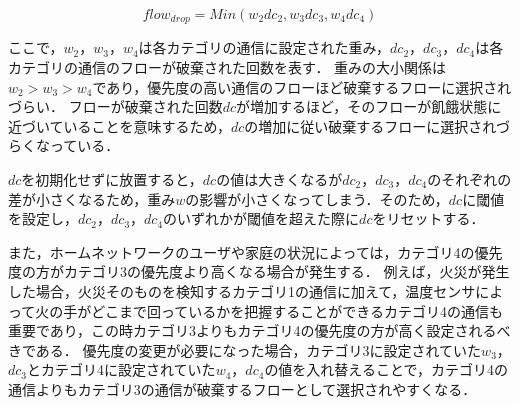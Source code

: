 \documentclass[a4paper,11pt,uplatex]{ujreport}
\begin{document}
  \begin{equation}
    flow_{drop} = Min(w_2 dc_2, w_3 dc_3, w_4 dc_4)
    \label{wd}
  \end{equation}

  ここで，$w_2$，$w_3$，$w_4$は各カテゴリの通信に設定された重み，$dc_2$，$dc_3$，$dc_4$は各カテゴリの通信のフローが破棄された回数を表す．
  重みの大小関係は$w_2 > w_3 > w_4$であり，優先度の高い通信のフローほど破棄するフローに選択されづらい．
  フローが破棄された回数$dc$が増加するほど，そのフローが飢餓状態に近づいていることを意味するため，$dc$の増加に従い破棄するフローに選択されづらくなっている．\par
  $dc$を初期化せずに放置すると，$dc$の値は大きくなるが$dc_2$，$dc_3$，$dc_4$のそれぞれの差が小さくなるため，重み$w$の影響が小さくなってしまう．そのため，$dc$に閾値を設定し，$dc_2$，$dc_3$，$dc_4$のいずれかが閾値を超えた際に$dc$をリセットする．\par
  また，ホームネットワークのユーザや家庭の状況によっては，カテゴリ4の優先度の方がカテゴリ3の優先度より高くなる場合が発生する．
  例えば，火災が発生した場合，火災そのものを検知するカテゴリ1の通信に加えて，温度センサによって火の手がどこまで回っているかを把握することができるカテゴリ4の通信も重要であり，この時カテゴリ3よりもカテゴリ4の優先度の方が高く設定されるべきである．
  優先度の変更が必要になった場合，カテゴリ3に設定されていた$w_3$，$dc_3$とカテゴリ4に設定されていた$w_4$，$dc_4$の値を入れ替えることで，カテゴリ4の通信よりもカテゴリ3の通信が破棄するフローとして選択されやすくなる．





\end{document}
